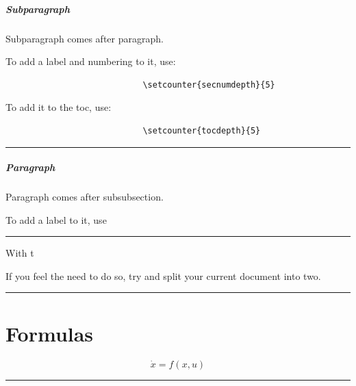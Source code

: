 \documentclass[12pt]{article}
\newcommand{\inOut}[1]{#1}                                %
\begin{document}
                \subparagraph{Subparagraph}

                    \begin{remark} \label{rem-subparagraph}
                        Subparagraph comes after paragraph.

                        To add a label and numbering to it, use:

                        \begin{lstlisting}
                            \setcounter{secnumdepth}{5}
                        \end{lstlisting}

                        To add it to the toc, use:

                        \begin{lstlisting}
                            \setcounter{tocdepth}{5}
                        \end{lstlisting}

                    \end{remark}\hrule

                    \subparagraph{Paragraph}

                    \begin{remark} \label{paragraph}
                        Paragraph comes after subsubsection.

                        To add a label to it, use \setcounter{secnumdepth}{4}
                    \end{remark}\hrule

                    \begin{remark} \label{remSec1}
                        With t

                        If you feel the need to do so, try and split your current document into two.
                    \end{remark}\hrule

\section{Formulas}\label{secForm}

    \begin{example} \label{expFor2}

        \inOut{
            \begin{equation*}\label{eqFor2}
                \dot{x} = f(x,u)
            \end{equation*}
        }

    \end{example}\hrule
\end{document}

